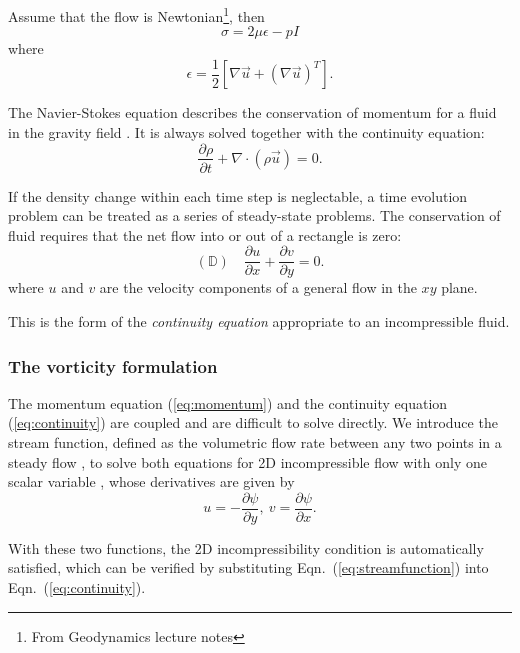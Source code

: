 \documentclass[11pt]{article}
\numberwithin{figure}{section}  %
\numberwithin{equation}{section}  %
\begin{document}
\begin{multicols}{2}
Assume that the flow is Newtonian\footnote{From Geodynamics lecture notes}, then
\begin{equation}
    \sigma = 2\mu\epsilon - pI
\end{equation}
where
\begin{equation}
    \epsilon = \frac{1}{2}[\nabla\vec{u} + (\nabla\vec{u})^T].
\end{equation}

The Navier-Stokes equation describes the conservation of momentum for a fluid in the gravity field \citep{gerya2009introduction}. It is always solved together with the continuity equation:
\begin{equation}
    \dfrac{\partial\rho}{\partial{t}} + \nabla\cdot(\rho\vec{u}) = 0.
\end{equation}

If the density change within each time step is neglectable, a time evolution problem can be treated as a series of steady-state problems. The conservation of fluid requires that the net flow into or out of a rectangle is zero:
\begin{equation}\label{eq:continuity}
    (\mathbb{D})\quad\dfrac{\partial{u}}{\partial{x}} + \dfrac{\partial{v}}{\partial{y}} = 0.
\end{equation}
where $u$ and $v$ are the velocity components of a general flow in the $xy$ plane.

This is the form of the \emph{continuity equation} appropriate to an incompressible fluid.

\subsubsection{The vorticity formulation}

The momentum equation (\ref{eq:momentum}) and the continuity equation (\ref{eq:continuity}) are coupled and are difficult to solve directly. We introduce the stream function, defined as the volumetric flow rate between any two points in a steady flow \citep{turcotte2014geodynamics}, to solve both equations for 2D incompressible flow with only one scalar variable \citep{ben2005pure}, whose derivatives are given by
\begin{equation}\label{eq:streamfunction}
    u = -\dfrac{\partial\psi}{\partial{y}},\ v = \dfrac{\partial\psi}{\partial{x}}.
\end{equation}

With these two functions, the 2D incompressibility condition is automatically satisfied, which can be verified by substituting Eqn.\ (\ref{eq:streamfunction}) into Eqn.\ (\ref{eq:continuity}).


\end{multicols}
\end{document}
